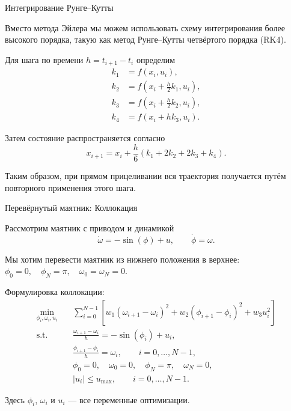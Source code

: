 \documentclass{beamer}
\begin{document}
	
	\begin{frame}{Интегрирование Рунге--Кутты}
		\begin{flushleft}
			Вместо метода Эйлера мы можем использовать схему
			интегрирования более высокого порядка, такую как метод Рунге--Кутты четвёртого порядка (RK4).
			
			\vspace{0.5em}
			
			Для шага по времени $h=t_{i+1}-t_i$ определим
			\[
			\begin{aligned}
				k_1 &= f(x_i,u_i),\\
				k_2 &= f\left(x_i+\frac{h}{2}k_1,u_i\right),\\
				k_3 &= f\left(x_i+\frac{h}{2}k_2,u_i\right),\\
				k_4 &= f\left(x_i+h k_3,u_i\right).
			\end{aligned}
			\]
			
			\vspace{0.5em}
			
			Затем состояние распространяется согласно
			\[
			x_{i+1}
			=
			x_i
			+
			\frac{h}{6}
			\left(
			k_1+2k_2+2k_3+k_4
			\right).
			\]
			
			Таким образом, при прямом прицеливании вся траектория
			получается путём повторного применения этого шага.
		\end{flushleft}
	\end{frame}
	\begin{frame}{Перевёрнутый маятник: Коллокация}
		\begin{flushleft}
			Рассмотрим маятник с приводом и динамикой
			\[
			\dot{\omega}=-\sin(\phi)+u,
			\qquad
			\dot{\phi}=\omega.
			\]
			
			\vspace{0.5em}
			
			Мы хотим перевести маятник из нижнего положения
			в верхнее: $		\phi_0=0,
			\quad
			\phi_N=\pi,
			\quad
			\omega_0=\omega_N=0.$
			
			Формулировка коллокации:
			\[
			\begin{aligned}
				\min_{\phi_i,\omega_i,u_i}\quad
				&
				\sum_{i=0}^{N-1}
				\left[
				w_1(\omega_{i+1}-\omega_i)^2
				+
				w_2(\phi_{i+1}-\phi_i)^2
				+
				w_3u_i^2
				\right]
				\\[0.5em]
				\text{s.t.}\quad
				&
				\frac{\omega_{i+1}-\omega_i}{h}
				=
				-\sin(\phi_i)+u_i,
				\\
				&
				\frac{\phi_{i+1}-\phi_i}{h}
				=
				\omega_i,
				\qquad i=0,\ldots,N-1,
				\\
				&
				\phi_0=0,\quad
				\omega_0=0,\quad
				\phi_N=\pi,\quad
				\omega_N=0,
				\\
				&
				|u_i|\leq u_{\max},
				\qquad i=0,\ldots,N-1.
			\end{aligned}
			\]
			
			Здесь $\phi_i$, $\omega_i$ и $u_i$ --- все
			переменные оптимизации.
		\end{flushleft}
	\end{frame}
	
\end{document}

